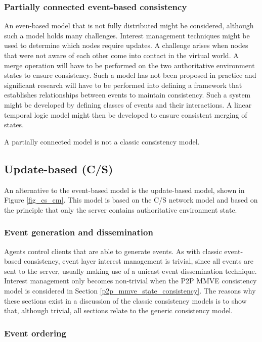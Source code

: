 \subsubsection{Partially connected event-based consistency}
An even-based model that is not fully distributed might be considered, although such a model holds many challenges. Interest management techniques might be used to determine which nodes require updates. A challenge arises when nodes that were not aware of each other come into contact in the virtual world. A merge operation will have to be performed on the two authoritative environment states to ensure consistency. Such a model has not been proposed in practice and significant research will have to be performed into defining a framework that establishes relationships between events to maintain consistency. Such a system might be developed by defining classes of events and their interactions. A linear temporal logic model might then be developed to ensure consistent merging of states.

A partially connected model is not a classic consistency model.

\subsection{Update-based (C/S)}
\label{classic_update_based}

An alternative to the event-based model is the update-based model, shown in Figure \ref{fig_cs_cm}. This model is based on the C/S network model and based on the principle that only the server contains authoritative environment state.

\subsubsection{Event generation and dissemination}
Agents control clients that are able to generate events. As with classic event-based consistency, event layer interest management is trivial, since all events are sent to the server, usually making use of a unicast event dissemination technique. Interest management only becomes non-trivial when the P2P MMVE consistency model is considered in Section \ref{p2p_mmve_state_consistency}. The reasons why these sections exist in a discussion of the classic consistency models is to show that, although trivial, all sections relate to the generic consistency model.

\subsubsection{Event ordering}
\label{cs_event_ordering}

